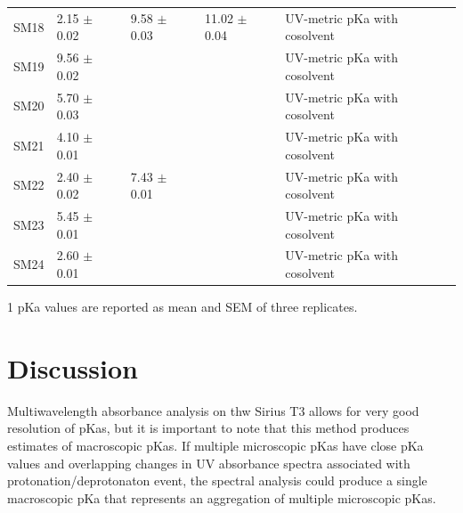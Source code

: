 \documentclass[9pt,lineno]{elife}
\begin{document}
\begin{table}[tb!]
\begin{center}
\begin{threeparttable}
\begin{tabular}{@{}lllll@{}}
SM18 & 2.15 $\pm$ 0.02 & 9.58 $\pm$ 0.03 & 11.02 $\pm$ 0.04 & UV-metric pKa with cosolvent \\
SM19 & 9.56 $\pm$ 0.02 &  &  & UV-metric pKa with cosolvent \\
SM20 & 5.70 $\pm$ 0.03 &  &  & UV-metric pKa with cosolvent \\
SM21 & 4.10 $\pm$ 0.01 &  &  & UV-metric pKa with cosolvent \\
SM22 & 2.40 $\pm$ 0.02 & 7.43 $\pm$ 0.01 &  & UV-metric pKa with cosolvent \\
SM23 & 5.45 $\pm$ 0.01 &  &  & UV-metric pKa with cosolvent \\
SM24 & 2.60 $\pm$ 0.01 &  &  & UV-metric pKa with cosolvent \\ \bottomrule
\end{tabular}
\begin{tablenotes}
\item[1] pKa values are reported as mean and SEM of three replicates.
\end{tablenotes}
\end{threeparttable}
\end{center}
\end{table}



\section{Discussion}
Multiwavelength absorbance analysis on thw Sirius T3 allows for very good resolution of pKas, but it is important to note that this method produces estimates of macroscopic pKas. If multiple microscopic pKas have close pKa values and overlapping changes in UV absorbance spectra associated with protonation/deprotonaton event, the spectral analysis could produce a single macroscopic pKa that represents an aggregation of multiple microscopic pKas.
\end{document}
